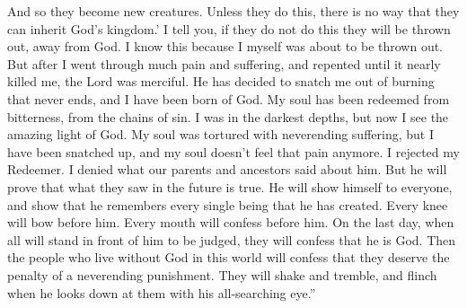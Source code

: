 \bverse \iffalse And thus they become new creatures; and unless they do this, they can in nowise inherit the kingdom of God. \fi
And so they become new creatures. Unless they do this, there is no way that they can inherit God's kingdom.\rq
\bverse \iffalse I say unto you, unless this be the case, they must be cast off; and this I know, because I was like to be cast off. \fi
I tell you, if they do not do this they will be thrown out, away from God. I know this because I myself was about to be thrown out.
\bverse \iffalse Nevertheless, after wading through much tribulations, repenting nigh unto death, the Lord in mercy hath seen fit to snatch me out of an everlasting burning, and I am born of God. \fi
But after I went through much pain and suffering, and repented until it nearly killed me, the Lord was merciful. He has decided to snatch me out of burning that never ends, and I have been born of God.
\bverse \iffalse My soul hath been redeemed from the gall of bitterness and bonds of iniquity. I was in the darkest abyss; but now I behold the marvelous light of God. My soul was racked with eternal torment; but I am snatched, and my soul is pained no more. \fi
My soul has been redeemed from bitterness, from the chains of sin. I was in the darkest depths, but now I see the amazing light of God. My soul was tortured with neverending suffering, but I have been snatched up, and my soul doesn't feel that pain anymore.
\bverse \iffalse I rejected my Redeemer, and denied that which had been spoken of by our fathers; but now that they may foresee that he will come, and that he remembereth every creature of his creating, he will make himself manifest unto all. \fi
I rejected my Redeemer. I denied what our parents and ancestors said about him. But he will prove that what they saw in the future is true. He will show himself to everyone, and show that he remembers every single being that he has created. 
\bverse \iffalse Yea, every knee shall bow, and every tongue confess before him. Yea, even at the last day, when all men shall stand to be judged of him, then shall they confess that he is God; then shall they confess, who live without God in the world, that the judgment of an everlasting punishment is just upon them; and they shall quake, and tremble, and shrink beneath the glance of his all-searching eye. \fi
Every knee will bow before him. Every mouth will confess before him. On the last day, when all will stand in front of him to be judged, they will confess that he is God. Then the people who live without God in this world will confess that they deserve the penalty of a neverending punishment. They will shake and tremble, and flinch when he looks down at them with his all-searching eye.''
